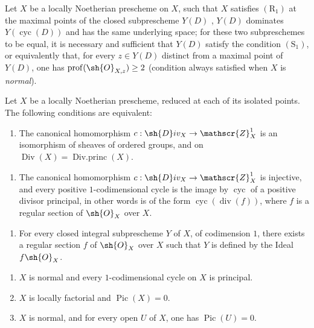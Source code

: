 \begin{corollary}[21.7.3]
\label{IV.21.7.3}
Let $X$ be a locally Noetherian prescheme on $X$, such that $X$ satisfies $(\mathrm{R}_1)$ at the maximal points of the closed subprescheme $Y(D)$ , $Y(D)$ dominates $Y(\operatorname{cyc}(D))$ and has the same underlying space;
for these two subpreschemes to be equal, it is necessary and sufficient that $Y(D)$ satisfy the condition $(\mathrm{S}_1)$, or equivalently that, for every $z\in Y(D)$ distinct from a maximal point of $Y(D)$, one has $\operatorname{prof}(\sh{O}_{X,z})\geq 2$ (condition always satisfied when $X$ is \emph{normal}).
\end{corollary}

\begin{proposition}[21.7.4]
\label{IV.21.7.4}
Let $X$ be a locally Noetherian prescheme, reduced at each of its isolated points.
The following conditions are equivalent:
\begin{enumerate}[label=\emph{\alph*)}]
  \item The canonical homomorphism $c:\sh{D}iv_X\to\mathscr{Z}_X^1$  is an isomorphism of sheaves of ordered groups, and on $\operatorname{Div}(X)=\operatorname{Div.princ}(X)$.
\end{enumerate}
\begin{enumerate}[label=\emph{\alph*$'$)}]
  \item The canonical homomorphism $c:\sh{D}iv_X\to\mathscr{Z}_X^1$ is injective, and every positive $1$-codimensional cycle is the image by $\operatorname{cyc}$ of a positive divisor principal, in other words is of the form $\operatorname{cyc}(\operatorname{div}(f))$, where $f$ is a regular section of $\sh{O}_X$ over $X$.
\end{enumerate}
\begin{enumerate}[label=\emph{\alph*$''$)}]
  \item For every closed integral subprescheme $Y$ of $X$, of codimension $1$, there exists a regular section $f$ of $\sh{O}_X$ over $X$ such that $Y$ is defined by the Ideal $f\sh{O}_X$.
\end{enumerate}
\begin{enumerate}
  \item[b)] $X$ is normal and every $1$-codimensional cycle on $X$ is principal.
  \item[c)] $X$ is locally factorial and $\operatorname{Pic}(X)=0$.
  \item[d)] $X$ is normal, and for every open $U$ of $X$, one has $\operatorname{Pic}(U)=0$.
\end{enumerate}
\end{proposition}

